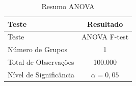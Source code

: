 \begin{table}[H]
\centering
\small
\caption{Resumo ANOVA}
\label{tab:anova_resumo}
\begin{tabular}{lc}
\toprule
\textbf{Teste} & \textbf{Resultado} \\
\midrule
Teste & ANOVA F-test \\
Número de Grupos & 1 \\
Total de Observações & 100.000 \\
Nível de Significância & $\alpha = 0,05$ \\
\bottomrule
\end{tabular}
\end{table}